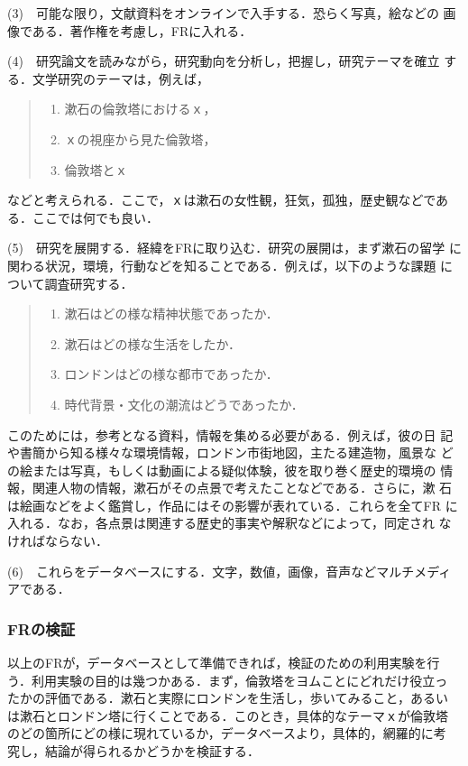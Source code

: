 (3)\ \ 可能な限り，文献資料をオンラインで入手する．恐らく写真，絵などの
画像である．著作権を考慮し，FRに入れる．

(4)\ \ 研究論文を読みながら，研究動向を分析し，把握し，研究テーマを確立
する．文学研究のテーマは，例えば，
\begin{quote}
\begin{enumerate}
\item 漱石の倫敦塔におけるｘ，
\item ｘの視座から見た倫敦塔，
\item 倫敦塔とｘ
\end{enumerate}
\end{quote}
などと考えられる．ここで，ｘは漱石の女性観，狂気，孤独，歴史観などであ
る．ここでは何でも良い．

(5)\ \ 研究を展開する．経緯をFRに取り込む．研究の展開は，まず漱石の留学
に関わる状況，環境，行動などを知ることである．例えば，以下のような課題
について調査研究する．
\begin{quote}
\begin{enumerate}
\item 漱石はどの様な精神状態であったか．
\item 漱石はどの様な生活をしたか．
\item ロンドンはどの様な都市であったか．
\item 時代背景・文化の潮流はどうであったか．
\end{enumerate}
\end{quote}

このためには，参考となる資料，情報を集める必要がある．例えば，彼の日
記や書簡から知る様々な環境情報，ロンドン市街地図，主たる建造物，風景な
どの絵または写真，もしくは動画による疑似体験，彼を取り巻く歴史的環境の
情報，関連人物の情報，漱石がその点景で考えたことなどである．さらに，漱
石は絵画などをよく鑑賞し，作品にはその影響が表れている．これらを全てFR
に入れる．なお，各点景は関連する歴史的事実や解釈などによって，同定され
なければならない．

(6)\ \ これらをデータベースにする．文字，数値，画像，音声などマルチメディ
アである．

\subsubsection{FRの検証}
以上のFRが，データベースとして準備できれば，検証のための利用実験を行
う．利用実験の目的は幾つかある．まず，倫敦塔をヨムことにどれだけ役立っ
たかの評価である．漱石と実際にロンドンを生活し，歩いてみること，あるい
は漱石とロンドン塔に行くことである．このとき，具体的なテーマｘが倫敦塔
のどの箇所にどの様に現れているか，データベースより，具体的，網羅的に考
究し，結論が得られるかどうかを検証する．

